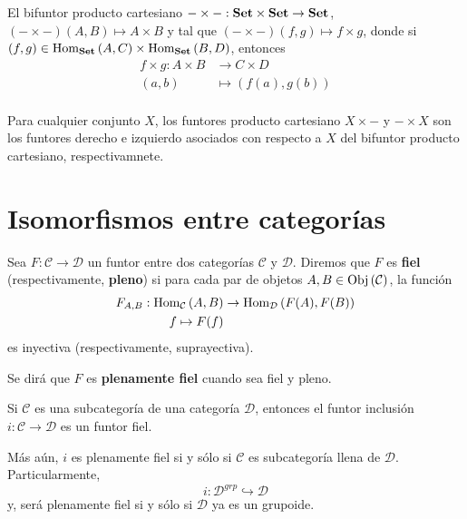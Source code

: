 \documentclass[12pt]{report}
\newcounter{it}
\theoremstyle{largebreak}
\newcommand\cf[3]{\ensuremath{#1:#2\rightarrow#3}}
\newcommand{\Obj}[1]{\ensuremath{\textup{Obj}\left(#1\right)}}
\newcommand{\Hom}[3]{\ensuremath{\textup{Hom}_{#1}\left(#2,#3\right)}}
\newcommand{\Cat}[1]{\ensuremath{\textup{\textbf{#1}}}}
\begin{document}
    \begin{exa}
        El bifuntor producto cartesiano $-\times -:\Cat{Set}\times\Cat{Set}\rightarrow\Cat{Set}$, $(-\times-)(A,B)\mapsto A\times B$ y tal que $(-\times-)(f,g)\mapsto f\times g$, donde si $(f,g)\in\Hom{\Cat{Set}}{A}{C}\times\Hom{\Cat{Set}}{B}{D}$, entonces
        \begin{equation*}
            \begin{split}
                f\times g:A\times B&\rightarrow C\times D\\
                (a,b)&\mapsto (f(a),g(b))\\ 
            \end{split}
        \end{equation*}
    \end{exa}

    \begin{exa}
        Para cualquier conjunto $X$, los funtores producto cartesiano $X\times -$ y $-\times X$ son los funtores derecho e izquierdo asociados con respecto a $X$ del bifuntor producto cartesiano, respectivamnete.
    \end{exa}

    \section{Isomorfismos entre categorías}

    \begin{mydef}
        Sea $\cf{F}{\mathcal{C}}{\mathcal{D}}$ un funtor entre dos categorías $\mathcal{C}$ y $\mathcal{D}$. Diremos que $F$ es \textbf{fiel} (respectivamente, \textbf{pleno}) si para cada par de objetos $A,B\in\Obj{\mathcal{C}}$, la función
        \begin{equation*}
            \begin{split}
                F_{A,B}:\Hom{\mathcal{C}}{A}{B}&\rightarrow\Hom{\mathcal{D}}{F(A)}{F(B)}\\
                f\mapsto F(f)
            \end{split}
        \end{equation*}
        es inyectiva (respectivamente, suprayectiva).

        Se dirá que $F$ es \textbf{plenamente fiel} cuando sea fiel y pleno.
    \end{mydef}

    \begin{exa}
        Si $\mathcal{C}$ es una subcategoría de una categoría $\mathcal{D}$, entonces el funtor inclusión $\cf{i}{\mathcal{C}}{\mathcal{D}}$ es un funtor fiel.

        Más aún, $i$ es plenamente fiel si y sólo si $\mathcal{C}$ es subcategoría llena de $\mathcal{D}$. Particularmente,
        \begin{equation*}
            i:\mathcal{D}^{grp}\hookrightarrow \mathcal{D}
        \end{equation*}
        y, será plenamente fiel si y sólo si $\mathcal{D}$ ya es un grupoide.
    \end{exa}
\end{document}
